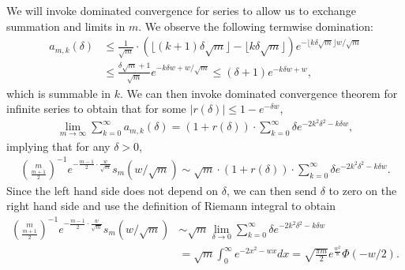 \documentclass[11pt]{article}
\newcommand{\prn}[1]{\left({#1}\right)} %
\newcommand{\<}{\langle} %
\renewcommand{\>}{\rangle}
\begin{document}
We will invoke dominated convergence for series to allow
us to exchange summation and limits in $m$.
We observe the following termwise domination:
\begin{align*}
  a_{m,k}(\delta) & \leq \frac{1}{\sqrt{m} } \cdot \prn{\lfloor (k+1) \delta \sqrt{m}  \rfloor - \lfloor k \delta \sqrt{m} \rfloor } e^{-\lfloor k \delta \sqrt{m} \rfloor w / \sqrt{m}} \\
  & \leq \frac{\delta \sqrt{m} + 1}{\sqrt{m}} e^{-k\delta w + w/\sqrt{m}} \nonumber
  \leq (\delta +1) e^{-k\delta w + w},
\end{align*}
which is summable in $k$.  We can then invoke dominated convergence theorem
for infinite series to obtain that for some $|r(\delta)| \leq 1 - e^{-\delta
  w}$,
\begin{align*}
  \lim_{m \to \infty} \sum_{k=0}^\infty a_{m,k}(\delta) = (1 + r(\delta)) \cdot \sum_{k=0}^\infty \delta e^{-2k^2 \delta^2 - k\delta w},
\end{align*}
implying that for any $\delta > 0$,
\begin{align*}
	\binom{m}{\frac{m+1}{2}}^{-1} e^{-\frac{m-1}{2} \cdot \frac{w}{\sqrt{m}}} s_m(w/\sqrt{m}) \sim \sqrt{m} \cdot (1 + r(\delta)) \cdot \sum_{k=0}^\infty \delta e^{-2k^2 \delta^2 - k\delta w}.
\end{align*}
Since the left hand side does not depend on $\delta$, we can then send $\delta$ to zero on the right hand side and use the definition of Riemann integral to obtain
\begin{align*}	
 	\binom{m}{\frac{m+1}{2}}^{-1} e^{-\frac{m-1}{2} \cdot \frac{w}{\sqrt{m}}} s_m(w/\sqrt{m}) 
	& \sim \sqrt{m} \lim_{\delta \to 0} \sum_{k=0}^\infty \delta e^{-2 k^2 \delta^2 - k\delta w } \nonumber \\
	& = \sqrt{m} \int_0^\infty e^{-2x^2 -wx} dx = \sqrt{\frac{ \pi m}{2}} e^{\frac{w^2}{8}} \Phi(-w/2).
\end{align*}
%
\end{document}
